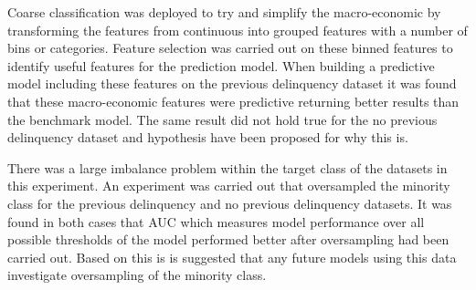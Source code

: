 Coarse classification was deployed to try and simplify the macro-economic by transforming the features from continuous into grouped features with a number of bins or categories. Feature selection was carried out on these binned features to identify useful features for the prediction model. When building a predictive model including these features on the previous delinquency dataset it was found that these macro-economic features were predictive returning better results than the benchmark model. The same result did not hold true for the no previous delinquency dataset and hypothesis have been proposed for why this is.


There was a large imbalance problem within the target class of the datasets in this experiment. An experiment was carried out that oversampled the minority class for the previous delinquency and no previous delinquency datasets. It was found in both cases that AUC which measures model performance over all possible thresholds of the model performed better after oversampling had been carried out. Based on this is is suggested that any future models using this data investigate oversampling of the minority class.




  